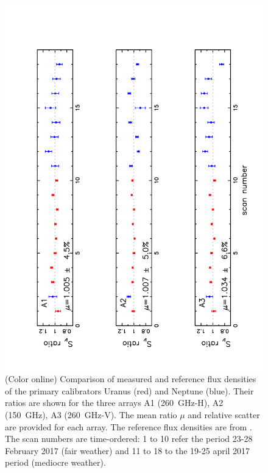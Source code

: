 \documentclass[]{aa} %
\begin{document}
\begin{figure}[h]
\centering
\includegraphics[angle=270,width=1.0\linewidth]{Ura_Nept_r9_10.pdf}
\caption{(Color online) Comparison of measured and reference flux densities of the primary calibrators Uranus (red) and Neptune (blue). Their ratios are shown for the three arrays A1 (260~GHz-H), A2 (150~GHz), A3 (260~GHz-V). The mean ratio $\mu$ and relative scatter are provided for each array. The reference flux densities are from \cite{moreno2010,Bendo2013}. The scan numbers are time-ordered: 1 to 10 refer the period 23-28 February 2017 (fair weather) and 11 to 18 to the 19-25 april 2017 period (mediocre weather).}
\label{fig:calibaccuracy}
\end{figure}
\end{document}

